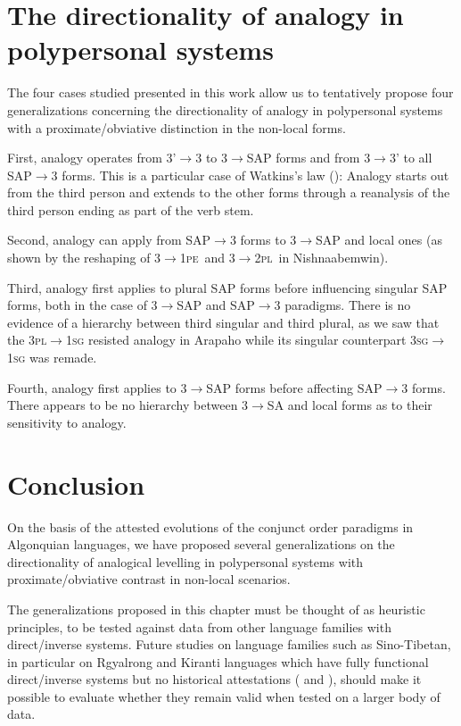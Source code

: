 \documentclass[twoside,a4paper,11pt]{article}
\newcommand{\sg}{\textsc{sg}}
\newcommand{\pl}{\textsc{pl}}
\newcommand{\pe}{\textsc{pe}}
\begin{document}
\section{The directionality of analogy in polypersonal systems}

The four cases studied presented in this work allow us to tentatively propose four generalizations concerning the directionality of analogy in polypersonal systems with a proximate/obviative distinction in the non-local forms.
 
First, analogy operates from 3'$\rightarrow$3 to 3$\rightarrow$SAP forms and from 3$\rightarrow$3' to all SAP$\rightarrow$3 forms. This is a particular case of   Watkins's law (\citealt{watkins62celtic}): Analogy starts out from the third person and extends to the other forms through a reanalysis of the third person ending as part of the verb stem.
 
Second, analogy can apply from SAP$\rightarrow$3 forms to 3$\rightarrow$SAP and  local ones (as shown by the reshaping of 3$\rightarrow$1\pe\ and 3$\rightarrow$2\pl\ in Nishnaabemwin).

Third,  analogy first applies to plural SAP forms before influencing singular SAP forms, both in the case of 3$\rightarrow$SAP and SAP$\rightarrow$3 paradigms. There is no evidence of a hierarchy between third singular and third plural, as we saw that the 3\pl{}$\rightarrow$1\sg{} resisted analogy in Arapaho while its singular counterpart 3\sg{}$\rightarrow$1\sg{} was remade.

Fourth, analogy first applies  to 3$\rightarrow$SAP forms before affecting SAP$\rightarrow$3 forms. There appears  to be no hierarchy between 3$\rightarrow$SA and local forms as to their sensitivity to analogy.

\section{Conclusion}

On the basis of the attested evolutions of the conjunct order paradigms in Algonquian languages, we have proposed several generalizations on the directionality of analogical levelling in polypersonal systems with proximate/obviative contrast in non-local scenarios. 

The generalizations proposed in this chapter must be thought of as heuristic principles, to be tested against data from other language families with direct/inverse systems. Future studies on language families such as Sino-Tibetan, in particular on Rgyalrong and Kiranti languages which have fully functional direct/inverse systems but no historical attestations (\citealp{delancey81direction, jackson02rentongdengdi, gongxun14agreement} and \citealp{lai15person}), should make it possible to evaluate whether they remain valid when tested on a larger body of data.
\end{document}
